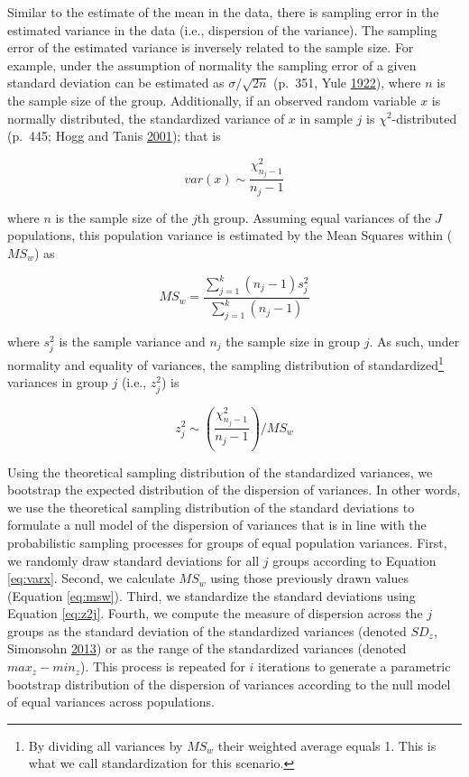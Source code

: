 \documentclass[a5paper]{book}
\let\rmarkdownfootnote\footnote%
\def\footnote{\protect\rmarkdownfootnote}
\begin{document}
Similar to the estimate of the mean in the data, there is sampling error
in the estimated variance in the data (i.e., dispersion of the
variance). The sampling error of the estimated variance is inversely
related to the sample size. For example, under the assumption of
normality the sampling error of a given standard deviation can be
estimated as \(\sigma/\sqrt{2n}\) (p.~351, Yule
\protect\hyperlink{ref-yule1922}{1922}), where \(n\) is the sample size
of the group. Additionally, if an observed random variable \(x\) is
normally distributed, the standardized variance of \(x\) in sample \(j\)
is \(\chi^2\)-distributed (p.~445; Hogg and Tanis
\protect\hyperlink{ref-hogg-tanis}{2001}); that is

\begin{equation}
var(x)\sim\frac{\chi^2_{n_j-1}}{n_j-1}
\label{eq:varx}
\end{equation}

where \(n\) is the sample size of the \(j\)th group. Assuming equal
variances of the \(J\) populations, this population variance is
estimated by the Mean Squares within (\(MS_w\)) as

\begin{equation}
MS_w=\frac{\sum\limits^k_{j=1}(n_j-1)s^2_j}{\sum\limits^k_{j=1}(n_j-1)}
\label{eq:msw}
\end{equation}

where \(s^2_j\) is the sample variance and \(n_j\) the sample size in
group \(j\). As such, under normality and equality of variances, the
sampling distribution of standardized\footnote{By dividing all variances
  by \(MS_w\) their weighted average equals 1. This is what we call
  standardization for this scenario.} variances in group \(j\) (i.e.,
\(z^2_j\)) is

\begin{equation}
z^2_j\sim\left(\frac{\chi^2_{n_j-1}}{n_j-1}\right)/MS_w
\label{eq:z2j}
\end{equation}

Using the theoretical sampling distribution of the standardized
variances, we bootstrap the expected distribution of the dispersion of
variances. In other words, we use the theoretical sampling distribution
of the standard deviations to formulate a null model of the dispersion
of variances that is in line with the probabilistic sampling processes
for groups of equal population variances. First, we randomly draw
standard deviations for all \(j\) groups according to Equation
\eqref{eq:varx}. Second, we calculate \(MS_w\) using those previously
drawn values (Equation \eqref{eq:msw}). Third, we standardize the standard
deviations using Equation \eqref{eq:z2j}. Fourth, we compute the measure
of dispersion across the \(j\) groups as the standard deviation of the
standardized variances (denoted \(SD_z\), Simonsohn
\protect\hyperlink{ref-doi:10.1177ux2f0956797613480366}{2013}) or as the
range of the standardized variances (denoted \(max_z-min_z\)). This
process is repeated for \(i\) iterations to generate a parametric
bootstrap distribution of the dispersion of variances according to the
null model of equal variances across populations.
\end{document}

